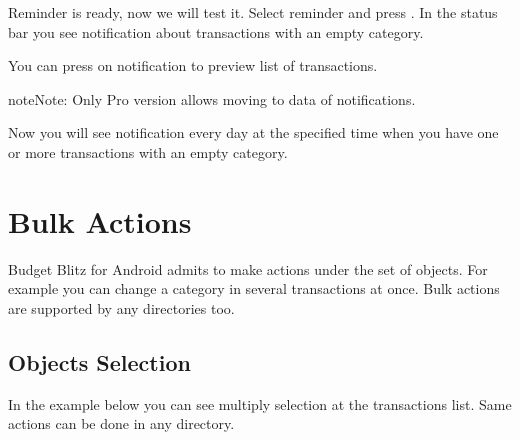 \documentclass[a4paper,10pt,english]{sphinxmanual}
\begin{document}
\noindent{}

Reminder is ready, now we will test it. Select reminder and press .
In the status bar you see notification about transactions with an empty category.

\noindent{}

\noindent{}

\noindent{}

You can press on notification to preview list of transactions.

\begin{sphinxadmonition}{note}{Note:}
Only Pro version allows moving to data of notifications.
\end{sphinxadmonition}

Now you will see notification every day at the specified time when
you have one or more transactions with an empty category.


\chapter{Bulk Actions}
\label{\detokenize{bulk-actions:bulk-actions}}\label{\detokenize{bulk-actions:chapter-bulk-actions}}\label{\detokenize{bulk-actions::doc}}
Budget Blitz for Android admits to make actions under the set of objects. For example you can change a category
in several transactions at once. Bulk actions are supported by any directories too.


\section{Objects Selection}
\label{\detokenize{bulk-actions:objects-selection}}
In the example below you can see multiply selection at the transactions list. Same actions can be done in
any directory.

\noindent{}

\noindent{}

\noindent{}
\end{document}
